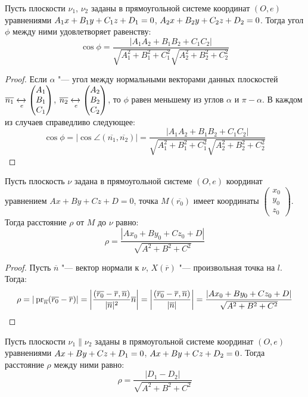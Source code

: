\begin{proposition}
	Пусть плоскости $\nu_1$, $\nu_2$ заданы в прямоугольной системе координат $(O, e)$ уравнениями $A_1x\hm{+}B_1y+C_1z+D_1=0$, $A_2x\hm{+}B_2y\hm{+}C_2z+D_2=0$. Тогда угол $\phi$ между ними удовлетворяет равенству:
	\[\cos{\phi} = \frac{|A_1A_2+B_1B_2+C_1C_2|}{\sqrt{A_1^2+B_1^2+C_1^2}\sqrt{A_2^2+B_2^2+C_2^2}}\]
\end{proposition}

\begin{proof}
	Если $\alpha$ "--- угол между нормальными векторами данных плоскостей $\overline{n_1} \xleftrightarrow[e]{} \begin{pmatrix}A_1\\B_1\\C_1\end{pmatrix}$, $\overline{n_2} \xleftrightarrow[e]{} \begin{pmatrix}A_2\\B_2\\C_2\end{pmatrix}$, то $\phi$ равен меньшему из углов $\alpha$ и $\pi - \alpha$. В каждом из случаев справедливо следующее:
	\[\cos{\phi} = |\cos{\angle(\overline{n_1}, \overline{n_2})}| = \frac{|A_1A_2+B_1B_2+C_1C_2|}{\sqrt{A_1^2+B_1^2+C_1^2}\sqrt{A_2^2+B_2^2+C_2^2}}\]
\end{proof}

\begin{proposition}
	Пусть плоскость $\nu$ задана в прямоугольной системе $(O, e)$ координат уравнением $Ax+By+Cz+D=0$, точка $M(\overline{r_0})$ имеет координаты $\begin{pmatrix}x_0\\y_0\\z_0\end{pmatrix}$. Тогда расстояние $\rho$ от $M$ до $\nu$ равно:
	\[\rho = \frac{|Ax_0 + By_0 + Cz_0+D|}{\sqrt{A^2 + B^2+C^2}}\]
\end{proposition}

\begin{proof}
	Пусть $\overline{n}$ "--- вектор нормали к $\nu$, $X(\overline{r})$ "--- произвольная точка на $l$. Тогда:
	\[\rho = |\operatorname{pr}_{\overline{n}}(\overline{r_0} - \overline{r})| = \left|\frac{(\overline{r_0} - \overline{r}, \overline{n})}{|\overline{n}|^2}\overline{n}\right| = \left|\frac{(\overline{r_0} - \overline{r}, \overline{n})}{|\overline{n}|}\right| = \frac{|Ax_0 + By_0 + Cz_0+D|}{\sqrt{A^2 + B^2+C^2}}\]
\end{proof}

\begin{proposition}
	Пусть плоскости $\nu_1 \parallel \nu_2$ заданы в прямоугольной системе координат $(O, e)$ уравнениями $Ax+By+Cz\hm{+}D_1=0$, $Ax\hm{+}By\hm{+}Cz+D_2=0$. Тогда расстояние $\rho$ между ними равно:
	\[\rho = \frac{|D_1 - D_2|}{\sqrt{A^2 + B^2 + C^2}}\]
\end{proposition}

